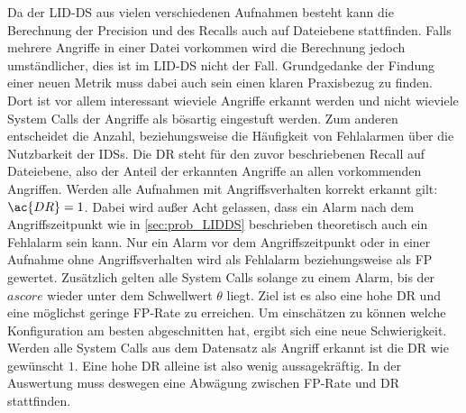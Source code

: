     Da der \ac{LID-DS} aus vielen verschiedenen Aufnahmen besteht kann die Berechnung der Precision und des Recalls auch auf Dateiebene stattfinden.
    Falls mehrere Angriffe in einer Datei vorkommen wird die Berechnung jedoch umständlicher, dies ist im \ac{LID-DS} nicht der Fall.  
    Grundgedanke der Findung einer neuen Metrik muss dabei auch sein einen klaren Praxisbezug zu finden. 
    Dort ist vor allem interessant wieviele Angriffe erkannt werden und nicht wieviele System Calls der Angriffe als bösartig eingestuft werden.
    Zum anderen entscheidet die Anzahl, beziehungsweise die Häufigkeit von Fehlalarmen über die Nutzbarkeit der \acp{IDS}.
    Die \ac{DR} steht für den zuvor beschriebenen Recall auf Dateiebene, also der Anteil der erkannten Angriffe an allen vorkommenden Angriffen.
    Werden alle Aufnahmen mit Angriffsverhalten korrekt erkannt gilt: $\ac{DR}=1$.
    Dabei wird außer Acht gelassen, dass ein Alarm nach dem Angriffszeitpunkt wie in \autoref{sec:prob_LIDDS} beschrieben theoretisch auch ein Fehlalarm sein kann.
    Nur ein Alarm vor dem Angriffszeitpunkt oder in einer Aufnahme ohne Angriffsverhalten wird als Fehlalarm beziehungsweise als \ac{FP} gewertet.
    Zusätzlich gelten alle System Calls solange zu einem Alarm, bis der $ascore$ wieder unter dem Schwellwert $\theta$ liegt.
    Ziel ist es also eine hohe \ac{DR} und eine möglichst geringe \ac{FP}-Rate zu erreichen.
    Um einschätzen zu können welche Konfiguration am besten abgeschnitten hat, ergibt sich eine neue Schwierigkeit.
    Werden alle System Calls aus dem Datensatz als Angriff erkannt ist die \ac{DR} wie gewünscht $1$.
    Eine hohe \ac{DR} alleine ist also wenig aussagekräftig.
    In der Auswertung muss deswegen eine Abwägung zwischen \ac{FP}-Rate und \ac{DR} stattfinden.
